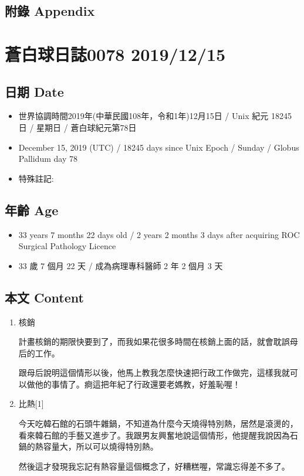 \documentclass[
]{article}
\providecommand{\tightlist}{%
  \setlength{\itemsep}{0pt}\setlength{\parskip}{0pt}}
\begin{document}
\hypertarget{ux9644ux9304-appendix-13}{%
\subsection{附錄 Appendix}\label{ux9644ux9304-appendix-13}}

\hypertarget{ux84bcux767dux7403ux65e5ux8a8c0078-20191215}{%
\section{蒼白球日誌0078
2019/12/15}\label{ux84bcux767dux7403ux65e5ux8a8c0078-20191215}}

\hypertarget{ux65e5ux671f-date-14}{%
\subsection{日期 Date}\label{ux65e5ux671f-date-14}}

\begin{itemize}
\tightlist
\item
  世界協調時間2019年(中華民國108年，令和1年)12月15日 / Unix 紀元 18245
  日 / 星期日 / 蒼白球紀元第78日
\item
  December 15, 2019 (UTC) / 18245 days since Unix Epoch / Sunday /
  Globus Pallidum day 78
\item
  特殊註記:
\end{itemize}

\hypertarget{ux5e74ux9f61-age-14}{%
\subsection{年齡 Age}\label{ux5e74ux9f61-age-14}}

\begin{itemize}
\tightlist
\item
  33 years 7 months 22 days old / 2 years 2 months 3 days after
  acquiring ROC Surgical Pathology Licence
\item
  33 歲 7 個月 22 天 / 成為病理專科醫師 2 年 2 個月 3 天
\end{itemize}

\hypertarget{ux672cux6587-content-14}{%
\subsection{本文 Content}\label{ux672cux6587-content-14}}

\begin{enumerate}
\def\labelenumi{\arabic{enumi}.}
\item
  核銷

  計畫核銷的期限快要到了，而我如果花很多時間在核銷上面的話，就會耽誤母后的工作。

  跟母后說明這個情形以後，他馬上教我怎麼快速把行政工作做完，這樣我就可以做他的事情了。痾這把年紀了行政還要老媽教，好羞恥喔！
\item
  比熱{[}1{]}

  今天吃韓石館的石頭牛雜鍋，不知道為什麼今天燒得特別熱，居然是滾燙的，看來韓石館的手藝又進步了。我跟男友興奮地說這個情形，他提醒我說因為石鍋的熱容量大，所以可以燒得特別熱。

  然後這才發現我忘記有熱容量這個概念了，好糟糕喔，常識忘得差不多了。
\end{enumerate}
\end{document}
